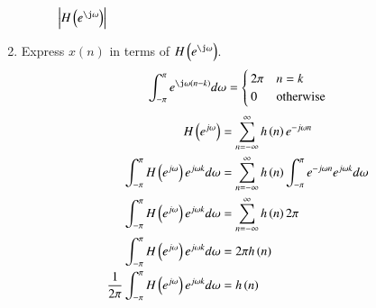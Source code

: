 \documentclass[journal,12pt,twocolumn]{IEEEtran}
\renewcommand\thesection{\arabic{section}}
\begin{document}
\begin{enumerate}[label=\thesection.\arabic*]
\begin{figure}[!ht]
\caption{$\abs{H\brak{e^{\j\omega}}}$}
\label{fig:dtft}
\end{figure}

\item Express $x(n)$ in terms of $H\brak{e^{\j \omega}}$.\\
\solution 
\begin{align}
	\int_{-\pi}^{\pi}e^{\j\omega(n - k)}d\omega =
	\begin{cases}
		2\pi & n = k \\
		0 & \textrm{otherwise}
	\end{cases}
\end{align}
\begin{align}
	H\left(e^{j\omega}\right) &= \sum_{n=-\infty}^{\infty} h\left(n\right) e^{-j\omega n}
	\\
	\int_{-\pi}^{\pi}H\left(e^{j\omega}\right)e^{j\omega k}d\omega &= \sum_{n=-\infty}^{\infty} h\left(n\right) \int_{-\pi}^{\pi} e^{-j\omega n}e^{j\omega k}d\omega
    \\
	\int_{-\pi}^{\pi}H\left(e^{j\omega}\right)e^{j\omega k}d\omega &= \sum_{n=-\infty}^{\infty} h\left(n\right) 2\pi
    \\
    \int_{-\pi}^{\pi}H\left(e^{j\omega}\right)e^{j\omega k}d\omega &= 2\pi h\left(n\right) 
	\\
	\frac{1}{2\pi} \int_{-\pi}^{\pi}H\left(e^{j\omega}\right)e^{j\omega k}d\omega &= h\left(n\right) 
\end{align} 
\end{enumerate}
\end{document}

